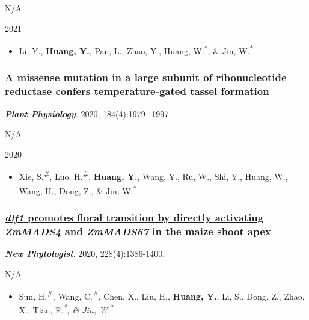 \documentclass[]{article}
\providecommand{\tightlist}{%
  \setlength{\itemsep}{0pt}\setlength{\parskip}{0pt}}
\begin{document}
N/A

2021

\begin{itemize}
\tightlist
\item
  Li, Y., \textbf{Huang, Y.}, Pan, L., Zhao, Y., Huang,
  W.\textsuperscript{*}, \& Jin, W.\textsuperscript{*}
\end{itemize}

\hypertarget{a-missense-mutation-in-a-large-subunit-of-ribonucleotide-reductase-confers-temperature-gated-tassel-formation}{%
\subsubsection{\texorpdfstring{\href{https://doi.org/10.3389/fimmu.2021.687975}{A
missense mutation in a large subunit of ribonucleotide reductase confers
temperature-gated tassel
formation}}{A missense mutation in a large subunit of ribonucleotide reductase confers temperature-gated tassel formation}}\label{a-missense-mutation-in-a-large-subunit-of-ribonucleotide-reductase-confers-temperature-gated-tassel-formation}}

\textbf{\emph{Plant Physiology}}. 2020, 184(4):1979\_1997

N/A

2020

\begin{itemize}
\tightlist
\item
  Xie, S.\textsuperscript{\#}, Luo, H.\textsuperscript{\#},
  \textbf{Huang, Y.}, Wang, Y., Ru, W., Shi, Y., Huang, W., Wang, H.,
  Dong, Z., \& Jin, W.\textsuperscript{*}
\end{itemize}

\hypertarget{dlf1-promotes-floral-transition-by-directly-activating-zmmads4-and-zmmads67-in-the-maize-shoot-apex}{%
\subsubsection{\texorpdfstring{\href{https://dx.doi.org/10.1111/nph.16772}{\emph{dlf1}
promotes floral transition by directly activating \emph{ZmMADS4} and
\emph{ZmMADS67} in the maize shoot
apex}}{dlf1 promotes floral transition by directly activating ZmMADS4 and ZmMADS67 in the maize shoot apex}}\label{dlf1-promotes-floral-transition-by-directly-activating-zmmads4-and-zmmads67-in-the-maize-shoot-apex}}

\textbf{\emph{New Phytologist}}. 2020, 228(4):1386-1400.

N/A

\begin{itemize}
\tightlist
\item
  Sun, H.\textsuperscript{\#}, Wang, C.\textsuperscript{\#}, Chen, X.,
  Liu, H., \textbf{Huang, Y.}, Li, S., Dong, Z., Zhao, X., Tian,
  F.\emph{\textsuperscript{*}, \& Jin, W.}\textsuperscript{*}
\end{itemize}
\end{document}
